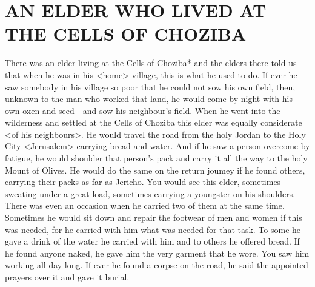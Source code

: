 \chapter{AN ELDER WHO LIVED AT THE CELLS OF CHOZIBA}

There was an elder living at the Cells of Choziba* and the elders there told us that when he was in his <home> village, this is what he used to do.
If ever he saw somebody in his village so poor that he could not sow his own field, then, unknown to the man who worked that land, he would come by night with his own oxen and seed—and sow his neighbour's field.
When he went into the wilderness and settled at the Cells of Choziba this elder was equally considerate <of his neighbours>.
He would travel the road from the holy Jordan to the Holy City <Jerusalem> carrying bread and water.
And if he saw a person overcome by fatigue, he would shoulder that person's pack and carry it all the way to the holy Mount of Olives.
He would do the same on the return joumey if he found others, carrying their packs as far as Jericho.
You would see this elder, sometimes sweating under a great load, sometimes carrying a youngster on his shoulders.
There was even an occasion when he carried two of them at the same time.
Sometimes he would sit down and repair the footwear of men and women if this was needed, for he carried with him what was needed for that task.
To some he gave a drink of the water he carried with him and to others he offered bread.
If he found anyone naked, he gave him the very garment that he wore.
You saw him working all day long.
If ever he found a corpse on the road, he said the appointed prayers over it and gave it burial.

